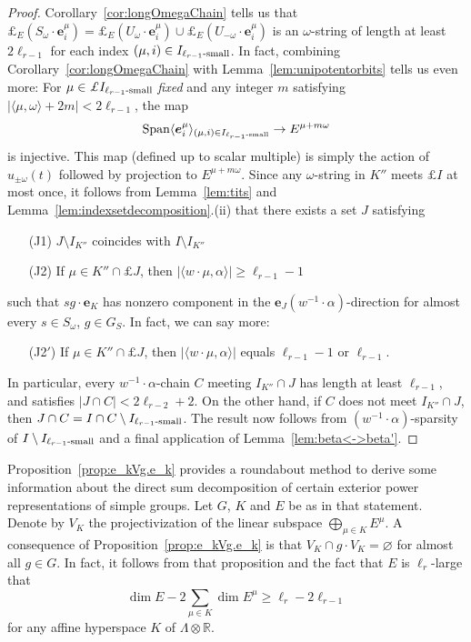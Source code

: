 \documentclass{amsart}
\def\mlprime{\/{\mathsurround=0pt$'$}}
\theoremstyle{plain}
\theoremstyle{definition}
\theoremstyle{remark}
\newcommand{\Vect}[1]{\mathbold{#1}}
\providecommand{\abs}[1]{\lvert#1\rvert}
\begin{document}
\begin{proof}
Corollary~\ref{cor:longOmegaChain}
tells us that $\pounds_{E}(S_{\omega} \cdot \Vect{e}^{\mu}_{i}) =
\pounds_{E}(U_{\omega} \cdot \Vect{e}^{\mu}_{i}) \cup
\pounds_{E}(U_{-\omega} \cdot \Vect{e}^{\mu}_{i})$ is an
$\omega$-string of length at least $2 \ell_{r - 1}$ for each
index $(\mu, i) \in I_{\textup{$\ell_{r - 1}$-small}}$. In fact, combining
Corollary~\ref{cor:longOmegaChain} with Lemma~\ref{lem:unipotentorbits}
tells us even more: For $\mu \in
\pounds I_{\textup{$\ell_{r - 1}$-small}}$ \emph{fixed} and any integer $m$ satisfying
$\abs{\langle \mu, \omega \rangle + 2m} < 2 \ell_{r - 1}$,
the map
$$
\operatorname{Span} \langle\Vect{e}^{\mu}_{i} \rangle_{(\mu, i)
\in I_{\textup{$\ell_{r - 1}$-small}}} \to E^{\mu + m\omega}
$$
is injective. This map (defined up to scalar multiple) is simply the action of $u_{\pm
\omega}(t)$ followed by projection to $E^{\mu + m\omega}$.
Since any $\omega$-string in $K''$ meets $\pounds I$ at most once, it follows from Lemma~\ref{lem:tits} and Lemma~\ref{lem:indexsetdecomposition}.(ii)
that there exists a set $J$ satisfying
\begin{itemize}
\item[(J1)] $J \setminus I_{K''}$ coincides with $I \setminus I_{K''}$
\item[(J2)] If $\mu \in K'' \cap \pounds J$, then $\abs{\langle w \cdot \mu, \alpha\rangle}
\geqslant \ell_{r - 1} -1$
\end{itemize}
such that $sg \cdot \Vect{e}_{K}$ has nonzero component in the
$\Vect{e}_{J}(w ^{-1}\cdot \alpha)$-direction for almost every $s \in S_{\omega}$, $g \in G_{S}$.
In fact, we can say more:
\begin{itemize}
\item[(J2\mlprime)] If $\mu \in K'' \cap \pounds J$, then $\abs{\langle w \cdot \mu,
\alpha\rangle}$ equals $\ell_{r - 1} -1$ or $\ell_{r - 1}$.
\end{itemize}
In particular, every $w^{-1} \cdot \alpha$-chain $C$ meeting $I_{K''} \cap J$ has
length at least $\ell_{r - 1}$, and satisfies $\abs{J \cap C} < 2 \ell_{r -
2} + 2$. On the other hand, if $C$ does not meet $I_{K''} \cap J$, then 
$J \cap C = I \cap C \setminus I_{\textup{$\ell_{r - 1}$-small}}$.
The result now follows from $(w^{-1} \cdot \alpha)$-sparsity of $I \setminus I_{\textup{$\ell_{r -
1}$-small}}$ and a final application of Lemma~\ref{lem:beta<->beta'}.
\end{proof}

Proposition~\ref{prop:e_kVg.e_k}
provides a roundabout method to derive some
information about the direct sum decomposition of certain exterior power
representations of simple groups. Let $G$, $K$ and $E$ be as in that statement. Denote by $V_{K}$ the projectivization of the linear subspace $\bigoplus_{\mu
\in K} E^{\mu}$. A consequence of Proposition~\ref{prop:e_kVg.e_k}
is that $V_{K} \cap g \cdot V_{K} = \varnothing$ for almost all $g \in G$. In fact, it
follows from that proposition and the fact that $E$ is $\ell_{r}$-large that
$$
\dim E - 2 \sum_{\mu \in K} \dim E^{\mu} \geqslant \ell_{r} - 2 \ell_{r - 1}
$$
for any affine hyperspace $K$ of $\Lambda \otimes \mathbb{R}$.
\end{document}
